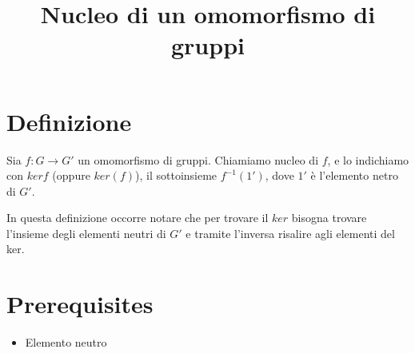 \documentclass[a4paper,10pt]{article}
\title{Nucleo di un omomorfismo di gruppi}
\author{}
\begin{document}
\maketitle

\section{Definizione}
Sia $f:G \longrightarrow G'$ un omomorfismo di gruppi.
Chiamiamo nucleo di $f$, e lo indichiamo con $ker f$ (oppure $ker(f)$), il sottoinsieme $f^{-1}({1'})$, dove $1'$ è l'elemento netro di $G'$. \cite{progmat1}

In questa definizione occorre notare che per trovare il $ker$ bisogna trovare l'insieme degli elementi neutri di $G'$ e tramite l'inversa risalire agli elementi del ker.

\section{Prerequisites}
\begin{itemize}
 \item Elemento neutro
\end{itemize}



 

\end{document}
